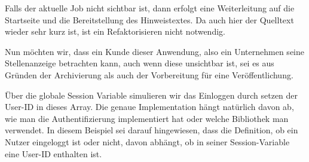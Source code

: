 \tddgreen
Falls der aktuelle Job nicht sichtbar ist, dann erfolgt eine Weiterleitung auf die Startseite und die Bereitstellung des Hinweistextes.
\tddrefactor
Da auch hier der Quelltext wieder sehr kurz ist, ist ein Refaktorisieren nicht notwendig.

Nun möchten wir, dass ein Kunde dieser Anwendung, also ein Unternehmen seine Stellenanzeige betrachten kann, auch wenn diese unsichtbar ist, sei es aus Gründen der Archivierung als auch der Vorbereitung für eine Veröffentlichung.

%
%
%
\begin{ruby}[label=test/functional/job\_controller\_test.rb]
  
    
  \PY{o}{[}\PY{o}{]}  

      

   
\end{ruby}

\tddred
Über die globale Session Variable simulieren wir das Einloggen durch setzen der User-ID in dieses Array. Die genaue Implementation hängt natürlich davon ab, wie man die Authentifizierung implementiert hat oder welche Bibliothek man verwendet. In diesem Beispiel sei darauf hingewiesen, dass die Definition, ob ein Nutzer eingeloggt ist oder nicht, davon abhängt, ob in seiner Session-Variable eine User-ID enthalten ist.

%
\begin{ruby}[label=app/controllers/job\_controller.rb]
 
    \PY{o}{[}\PY{o}{]}
       \PY{o}{[}\PY{o}{]}
        
\end{ruby}

